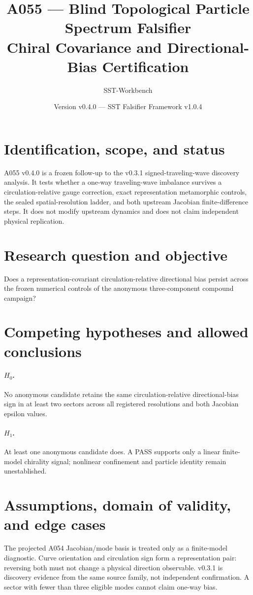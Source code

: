 \documentclass[11pt,a4paper]{article}
\title{A055 --- Blind Topological Particle Spectrum Falsifier\\Chiral Covariance and Directional-Bias Certification}
\author{SST-Workbench}\date{Version v0.4.0 --- SST Falsifier Framework v1.0.4}
\begin{document}
\maketitle
\section{Identification, scope, and status}
A055 v0.4.0 is a frozen follow-up to the v0.3.1 signed-traveling-wave discovery analysis. It tests whether a one-way traveling-wave imbalance survives a circulation-relative gauge correction, exact representation metamorphic controls, the sealed spatial-resolution ladder, and both upstream Jacobian finite-difference steps. It does not modify upstream dynamics and does not claim independent physical replication.
\section{Research question and objective}
Does a representation-covariant circulation-relative directional bias persist across the frozen numerical controls of the anonymous three-component compound campaign?
\section{Competing hypotheses and allowed conclusions}
\paragraph{$H_0$.} No anonymous candidate retains the same circulation-relative directional-bias sign in at least two sectors across all registered resolutions and both Jacobian epsilon values.\paragraph{$H_1$.} At least one anonymous candidate does. A PASS supports only a linear finite-model chirality signal; nonlinear confinement and particle identity remain unestablished.
\section{Assumptions, domain of validity, and edge cases}
The projected A054 Jacobian/mode basis is treated only as a finite-model diagnostic. Curve orientation and circulation sign form a representation pair: reversing both must not change a physical direction observable. v0.3.1 is discovery evidence from the same source family, not independent confirmation. A sector with fewer than three eligible modes cannot claim one-way bias.
\end{document}
